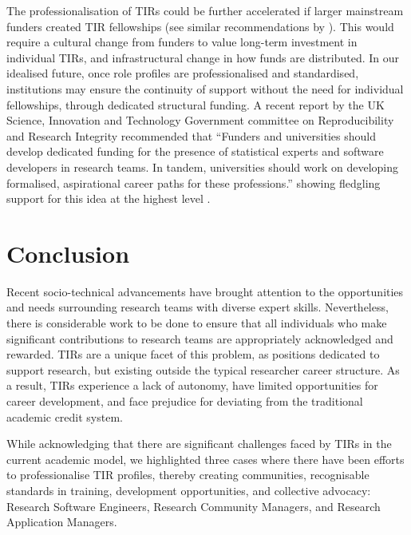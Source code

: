 \documentclass[authordate,meta]{jote-new-article}
\begin{document}
The professionalisation of TIRs could be further accelerated if larger mainstream funders created TIR fellowships (see similar recommendations by \textcites{Teperek2022}{UKRI-ResearchEngland2022}). This would require a cultural change from funders to value long-term investment in individual TIRs, and infrastructural change in how funds are distributed. In our idealised future, once role profiles are professionalised and standardised, institutions may ensure the continuity of support without the need for individual fellowships, through dedicated structural funding. A recent report by the UK Science, Innovation and Technology Government committee \parencites{Science2023} on Reproducibility and Research Integrity recommended that “Funders and universities should develop dedicated funding for the presence of statistical experts and software developers in research teams. In tandem, universities should work on developing formalised, aspirational career paths for these professions.” showing fledgling support for this idea at the highest level \parencites{Science2023}.



\section{Conclusion}



Recent socio-technical advancements have brought attention to the opportunities and needs surrounding research teams with diverse expert skills. Nevertheless, there is considerable work to be done to ensure that all individuals who make significant contributions to research teams are appropriately acknowledged and rewarded. TIRs are a unique facet of this problem, as positions dedicated to support research, but existing outside the typical researcher career structure. As a result, TIRs experience a lack of autonomy, have limited opportunities for career development, and face prejudice for deviating from the traditional academic credit system.







While acknowledging that there are significant challenges faced by TIRs in the current academic model, we highlighted three cases where there have been efforts to professionalise TIR profiles, thereby creating communities, recognisable standards in training, development opportunities, and collective advocacy: Research Software Engineers, Research Community Managers, and Research Application Managers.
\end{document}
